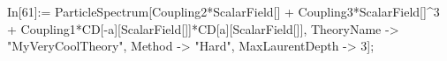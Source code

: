 In[61]:= ParticleSpectrum[Coupling2*ScalarField[] + Coupling3*ScalarField[]^3 + Coupling1*CD[-a][ScalarField[]]*CD[a][ScalarField[]], TheoryName -> "MyVeryCoolTheory", Method -> "Hard", MaxLaurentDepth -> 3]; 